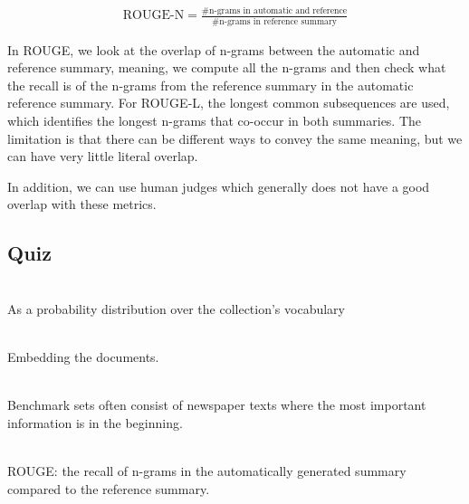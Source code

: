 \begin{definition}[ROUGE]
  \begin{align*}
    \text{ROUGE-N} = \frac{
      \text{\# n-grams in automatic and reference}
    }{
      \text{\# n-grams in reference summary}
    }
  \end{align*}
\end{definition}

In ROUGE, we look at the overlap of n-grams between the automatic and reference
summary, meaning, we compute all the n-grams and then check what the recall is
of the n-grams from the reference summary in the automatic reference summary.
For ROUGE-L, the longest common subsequences are used, which
identifies the longest
n-grams that co-occur in both summaries. The limitation is that there
can be different
ways to convey the same meaning, but we can have very little literal overlap.

In addition, we can use human judges which generally does not have a
good overlap
with these metrics.

\subsection{Quiz}

\begin{quiz}
  ~\\
  As a probability distribution over the collection's vocabulary
\end{quiz}

\begin{quiz}
  ~\\
  Embedding the documents.
\end{quiz}

\begin{quiz}
  ~\\
  Benchmark sets often consist of newspaper texts where the most
  important information is
  in the beginning.
\end{quiz}

\begin{quiz}
  ~\\
  ROUGE: the recall of n-grams in the automatically generated summary
  compared to the reference summary.
\end{quiz}
